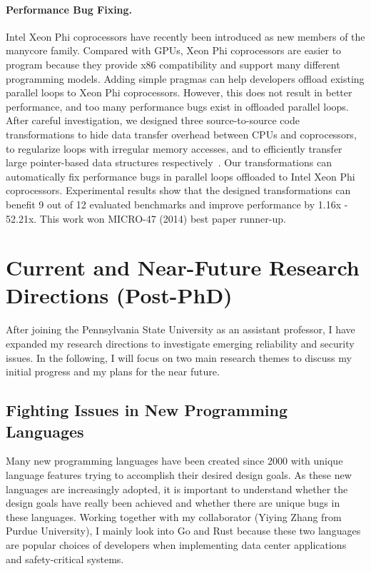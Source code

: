 \documentclass[10pt]{article}
\begin{document}
\paragraph{Performance Bug Fixing.}
Intel Xeon Phi coprocessors have recently been introduced 
as new members of the manycore family.
Compared with GPUs, Xeon Phi coprocessors are easier to program
because they provide x86 compatibility and support many different programming models.
Adding simple pragmas can help developers offload existing parallel loops 
to Xeon Phi coprocessors. 
However, this does not result in better performance, 
and too many performance bugs exist in  
offloaded parallel loops. 
After careful investigation, we designed three source-to-source code transformations to 
hide data transfer overhead between CPUs and coprocessors, 
to regularize loops with irregular memory accesses, 
and to efficiently transfer large pointer-based data structures respectively~\cite{Song14MICRO}.
Our transformations can automatically fix performance bugs in parallel loops offloaded 
to Intel Xeon Phi coprocessors. 
Experimental results show that the designed transformations can benefit 9 
out of 12 evaluated benchmarks and improve performance by 1.16x - 52.21x. 
This work won MICRO-47 (2014) best paper runner-up.



\vspace{-.1in}
\section{Current and Near-Future Research Directions (Post-PhD)}
After joining the Pennsylvania State University as an assistant professor,
I have expanded my research directions to investigate
emerging reliability and security issues.  
In the following, I will focus on two main research themes 
to discuss my initial progress and my plans for the near future. 

\vspace{-.1in}
\subsection{Fighting Issues in New Programming Languages}
Many new programming languages have been created since 2000
with unique language features trying to accomplish their desired design goals.
As these new languages are increasingly adopted, it is important to understand 
whether the design goals have really been achieved 
and whether there are unique bugs in these languages. 
Working together with my collaborator (Yiying Zhang from Purdue University), 
I mainly look into Go and Rust because 
these two languages are popular choices 
of developers when implementing 
data center applications and safety-critical systems. 
\end{document}
